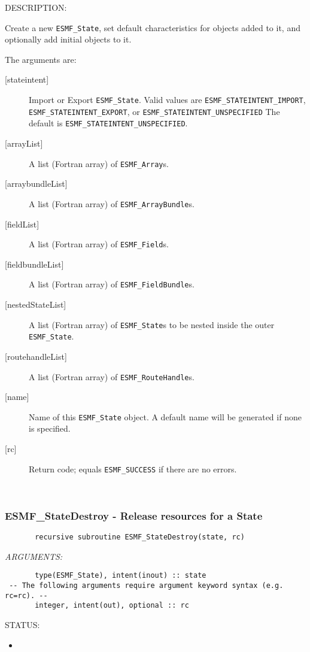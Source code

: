 {\sf DESCRIPTION:\\ }


   Create a new {\tt ESMF\_State}, set default characteristics for
   objects added to it, and optionally add initial objects to it.
  
   The arguments are:
   \begin{description}
   \item[{[stateintent]}]
   Import or Export {\tt ESMF\_State}. Valid values are
   {\tt ESMF\_STATEINTENT\_IMPORT}, {\tt ESMF\_STATEINTENT\_EXPORT},
   or {\tt ESMF\_STATEINTENT\_UNSPECIFIED} The default
   is {\tt ESMF\_STATEINTENT\_UNSPECIFIED}.
   \item[{[arrayList]}]
   A list (Fortran array) of {\tt ESMF\_Array}s.
   \item[{[arraybundleList]}]
   A list (Fortran array) of {\tt ESMF\_ArrayBundle}s.
   \item[{[fieldList]}]
   A list (Fortran array) of {\tt ESMF\_Field}s.
   \item[{[fieldbundleList]}]
   A list (Fortran array) of {\tt ESMF\_FieldBundle}s.
   \item[{[nestedStateList]}]
   A list (Fortran array) of {\tt ESMF\_State}s to be nested
   inside the outer {\tt ESMF\_State}.
   \item[{[routehandleList]}]
   A list (Fortran array) of {\tt ESMF\_RouteHandle}s.
   \item[{[name]}]
   Name of this {\tt ESMF\_State} object. A default name will be generated
   if none is specified.
   \item[{[rc]}]
   Return code; equals {\tt ESMF\_SUCCESS} if there are no errors.
   \end{description}
   
 
\mbox{}\hrulefill\ 
 
\subsubsection [ESMF\_StateDestroy] {ESMF\_StateDestroy - Release resources for a State}


  
\begin{verbatim}       recursive subroutine ESMF_StateDestroy(state, rc)\end{verbatim}{\em ARGUMENTS:}
\begin{verbatim}       type(ESMF_State), intent(inout) :: state
 -- The following arguments require argument keyword syntax (e.g. rc=rc). --
       integer, intent(out), optional :: rc\end{verbatim}
{\sf STATUS:}
   \begin{itemize}
   \item{}
   \end{itemize}
  
